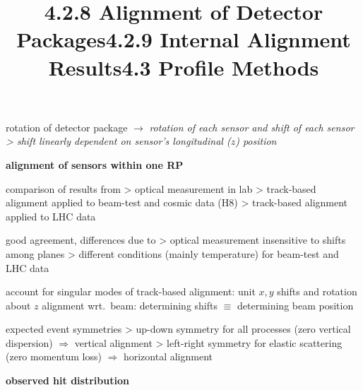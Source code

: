 \vfil

\title{4.2.8 Alignment of Detector Packages}
\vskip-3mm

\> rotation of detector package $\longrightarrow$ \em{rotation} of each sensor and \em{shift} of each sensor
\>> shift linearly dependent on sensor's longitudinal ($z$) position





\newpage%
\title{4.2.9 Internal Alignment Results}

\centerline{\bf alignment of sensors within one RP}

\> comparison of results from
\>> optical measurement in lab
\>> track-based alignment applied to beam-test and cosmic data (H8)
\>> track-based alignment applied to LHC data


\> good agreement, differences due to
\>> optical measurement insensitive to shifts among planes
\>> different conditions (mainly temperature) for beam-test and LHC data


%
%

\newpage%
\title{4.3 Profile Methods}

\> account for singular modes of track-based alignment: unit $x, y$ shifts and rotation about $z$
\> alignment wrt.~beam: determining shifts $\equiv$ determining beam position

\> expected event symmetries
\>> up-down symmetry for all processes (zero vertical dispersion) $\Rightarrow$ vertical alignment
\>> left-right symmetry for elastic scattering (zero momentum loss) $\Rightarrow$ horizontal alignment

\vfil
\centerline{\bf observed hit distribution}
\vskip3mm

